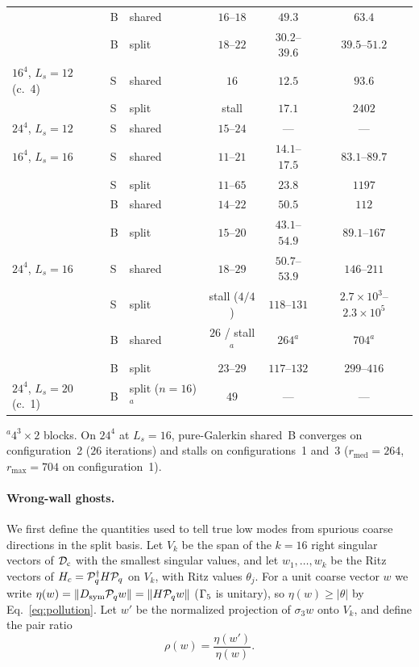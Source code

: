 \begin{table}[t]
\begin{tabular}{@{}lllccc@{}}
 & B & shared & $16$--$18$ & $49.3$ & $63.4$\\
 & B & split & $18$--$22$ & $30.2$--$39.6$ & $39.5$--$51.2$\\
\midrule
$16^4$, $L_s=12$ (c.~4) & S & shared & $16$ & $12.5$ & $93.6$\\
 & S & split & stall & $17.1$ & $2402$\\
$24^4$, $L_s=12$ & S & shared & $15$--$24$ & --- & ---\\
\midrule
$16^4$, $L_s=16$ & S & shared & $11$--$21$ & $14.1$--$17.5$ & $83.1$--$89.7$\\
 & S & split & $11$--$65$ & $23.8$ & $1197$\\
 & B & shared & $14$--$22$ & $50.5$ & $112$\\
 & B & split & $15$--$20$ & $43.1$--$54.9$ & $89.1$--$167$\\
\addlinespace[2pt]
$24^4$, $L_s=16$ & S & shared & $18$--$29$ & $50.7$--$53.9$ & $146$--$211$\\
 & S & split & stall ($4/4$) & $118$--$131$ & $2.7{\times}10^3$--$2.3{\times}10^5$\\
 & B & shared & $26$ / stall$^{a}$ & $264^{a}$ & $704^{a}$\\
 & B & split & $23$--$29$ & $117$--$132$ & $299$--$416$\\
\addlinespace[2pt]
$24^4$, $L_s=20$ (c.~1) & B & split ($n=16$)$^{a}$ & $49$ & --- & ---\\
\bottomrule
\end{tabular}
\vspace{2pt}
\parbox{\linewidth}{\footnotesize $^{a}$$4^3\times2$ blocks. On $24^4$ at $L_s=16$, pure-Galerkin
shared~B converges on configuration~2 ($26$ iterations) and stalls on configurations~1 and~3
($r_{\mathrm{med}}=264$, $r_{\max}=704$ on configuration~1).}
\end{table}

\paragraph{Wrong-wall ghosts.}
We first define the quantities used to tell true low modes from spurious coarse directions in the
split basis. Let $V_k$ be the span of the $k=16$ right singular vectors of $\mathcal D_{\mathrm c}$ with the smallest
singular values, and let $w_1,\dots,w_k$ be the Ritz vectors of $H_c=\mathcal P_q^{\dagger} H\mathcal P_q$ on $V_k$, with
Ritz values $\theta_j$. For a unit coarse vector $w$ we write $\eta(w)=\|D_{\mathrm{sym}}\mathcal P_q w\|=\|H\mathcal P_q w\|$
($\Gamma_5$ is unitary), so $\eta(w)\ge|\theta|$ by Eq.~\eqref{eq:pollution}. Let $w'$ be the
normalized projection of $\sigma_3w$ onto $V_k$, and define the pair ratio
\begin{equation}
\rho(w)=\frac{\eta(w')}{\eta(w)} .
\label{eq:pairratio}
\end{equation}

